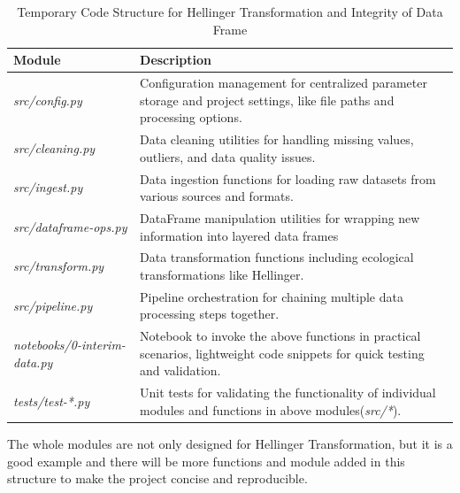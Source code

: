 \begin{table}[!h]
\centering
\caption{Temporary Code Structure for Hellinger Transformation and Integrity of Data Frame}
\label{tab:module_structure}
\renewcommand{\arraystretch}{1.3}
\begin{tabular}{p{3.5cm}p{9.5cm}}
\hline
\textbf{Module} & \textbf{Description} \\
\hline
\textit{src/config.py} & Configuration management for centralized parameter storage and project settings,
like file paths and processing options. \\
\hline
\textit{src/cleaning.py} & Data cleaning utilities for handling missing values, outliers, and data quality issues. \\
\hline
\textit{src/ingest.py} & Data ingestion functions for loading raw datasets from various sources and formats. \\
\hline
\textit{src/dataframe-ops.py} & DataFrame manipulation utilities for wrapping new information into layered data frames \\
\hline
\textit{src/transform.py} & Data transformation functions including ecological transformations like Hellinger. \\
\hline
\textit{src/pipeline.py} & Pipeline orchestration for chaining multiple data processing steps together. \\
\hline
\textit{notebooks/0-interim-data.py} & Notebook to invoke the above functions in practical scenarios,
lightweight code snippets for quick testing and validation. \\
\hline
\textit{tests/test-*.py} & Unit tests for validating the functionality of individual modules and functions
in above modules(\textit{src/*}). \\
\hline
\end{tabular}
\end{table}

The whole modules are not only designed for Hellinger Transformation, but it is a good example and there will be more
functions and module added in this structure to make the project concise and reproducible.

